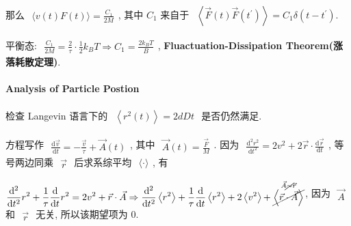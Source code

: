 \documentclass[../../main.tex]{subfiles}
\begin{document}
那么 $\begin{aligned}
    \langle v(t)F(t)\rangle = \frac{C_{1}}{2M}
\end{aligned}$, 其中 $C_{1}$ 来自于 $\begin{aligned}
    \left\langle\vec{F}(t)\vec{F}\left(t^{\prime}\right)\right\rangle = C_{1}\delta\left(t-t^{\prime}\right).
\end{aligned}$

平衡态: $\begin{aligned}
    \frac{C_{1}}{2M} = \frac{2}{\tau}\cdot\frac{1}{2}k_{B}T\Rightarrow \boxed{C_{1} = \frac{2k_{B}T}{B}}
\end{aligned}$, \textbf{Fluactuation-Dissipation Theorem(涨落耗散定理)}.

\paragraph{Analysis of Particle Postion}
检查 Langevin 语言下的 $\begin{aligned}
    \left\langle r^{2}(t)\right\rangle = 2dDt
\end{aligned}$ 是否仍然满足.

方程写作 $\begin{aligned}
    \frac{\mathrm{d}\vec{v}}{\mathrm{d}t} = -\frac{\vec{v}}{\tau} + \vec{A}(t)
\end{aligned}$, 其中 $\begin{aligned}
    \vec{A}(t) = \frac{\vec{F}}{M}
\end{aligned}$. 因为 $\begin{aligned}
    \frac{\mathrm{d}^{2}r^{2}}{\mathrm{d}t^{2}} = 2v^{2} + 2\vec{r}\cdot\frac{\mathrm{d}\vec{r}}{\mathrm{d}t}
\end{aligned}$, 等号两边同乘 $\begin{aligned}
    \vec{r}
\end{aligned}$ 后求系综平均 $\begin{aligned}
    \langle\cdot\rangle
\end{aligned}$, 有

$\begin{aligned}
    \frac{\mathrm{d}^{2}}{\mathrm{d}t^{2}}r^{2} + \frac{1}{\tau}\frac{\mathrm{d}}{\mathrm{d}t}r^{2} = 2v^{2} + \vec{r}\cdot\vec{A}\Rightarrow 
    \frac{\mathrm{d}^{2}}{\mathrm{d}t^{2}}\left\langle r^{2}\right\rangle + \frac{1}{\tau}\frac{\mathrm{d}}{\mathrm{d}t}\left\langle r^{2}\right\rangle + 2\left\langle v^{2}\right\rangle + \stackrel{\vec{A}\cancel{\sim}\vec{r}}{\cancel{\left\langle \vec{r}\cdot\vec{A}\right\rangle}}
\end{aligned}$, 因为 $\begin{aligned}
    \vec{A}
\end{aligned}$ 和 $\begin{aligned}
    \vec{r}
\end{aligned}$ 无关, 所以该期望项为 0.
\end{document}
